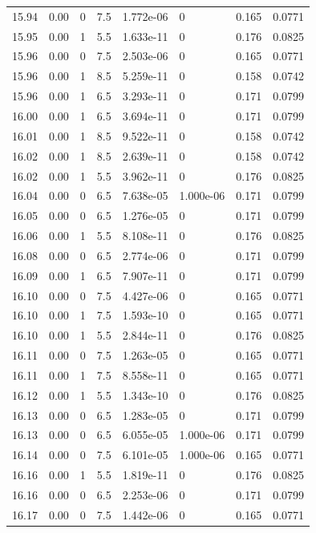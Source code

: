 \documentclass[preview]{standalone}
\begin{document}
{{{{{{{{{{{{{{{{{{{\begin{tabular}{L{1.2cm}C{1.2cm} C{0.3cm}C{0.5cm} C{1.4cm}C{1.4cm} C{1.4cm}C{1.4cm}}
  15.94  &  0.00  & 0     & 7.5 &  1.772e-06  & 0  & 0.165 &  0.0771   \\ 
  15.95  &  0.00  & 1     & 5.5 &  1.633e-11  & 0  & 0.176 &  0.0825   \\ 
  15.96  &  0.00  & 0     & 7.5 &  2.503e-06  & 0  & 0.165 &  0.0771   \\ 
  15.96  &  0.00  & 1     & 8.5 &  5.259e-11  & 0  & 0.158 &  0.0742   \\ 
  15.96  &  0.00  & 1     & 6.5 &  3.293e-11  & 0  & 0.171 &  0.0799   \\ 
  16.00  &  0.00  & 1     & 6.5 &  3.694e-11  & 0  & 0.171 &  0.0799   \\ 
  16.01  &  0.00  & 1     & 8.5 &  9.522e-11  & 0  & 0.158 &  0.0742   \\ 
  16.02  &  0.00  & 1     & 8.5 &  2.639e-11  & 0  & 0.158 &  0.0742   \\ 
  16.02  &  0.00  & 1     & 5.5 &  3.962e-11  & 0  & 0.176 &  0.0825   \\ 
  16.04  &  0.00  & 0     & 6.5 &  7.638e-05  & 1.000e-06  & 0.171 &  0.0799   \\ 
  16.05  &  0.00  & 0     & 6.5 &  1.276e-05  & 0  & 0.171 &  0.0799   \\ 
  16.06  &  0.00  & 1     & 5.5 &  8.108e-11  & 0  & 0.176 &  0.0825   \\ 
  16.08  &  0.00  & 0     & 6.5 &  2.774e-06  & 0  & 0.171 &  0.0799   \\ 
  16.09  &  0.00  & 1     & 6.5 &  7.907e-11  & 0  & 0.171 &  0.0799   \\ 
  16.10  &  0.00  & 0     & 7.5 &  4.427e-06  & 0  & 0.165 &  0.0771   \\ 
  16.10  &  0.00  & 1     & 7.5 &  1.593e-10  & 0  & 0.165 &  0.0771   \\ 
  16.10  &  0.00  & 1     & 5.5 &  2.844e-11  & 0  & 0.176 &  0.0825   \\ 
  16.11  &  0.00  & 0     & 7.5 &  1.263e-05  & 0  & 0.165 &  0.0771   \\ 
  16.11  &  0.00  & 1     & 7.5 &  8.558e-11  & 0  & 0.165 &  0.0771   \\ 
  16.12  &  0.00  & 1     & 5.5 &  1.343e-10  & 0  & 0.176 &  0.0825   \\ 
  16.13  &  0.00  & 0     & 6.5 &  1.283e-05  & 0  & 0.171 &  0.0799   \\ 
  16.13  &  0.00  & 0     & 6.5 &  6.055e-05  & 1.000e-06  & 0.171 &  0.0799   \\ 
  16.14  &  0.00  & 0     & 7.5 &  6.101e-05  & 1.000e-06  & 0.165 &  0.0771   \\ 
  16.16  &  0.00  & 1     & 5.5 &  1.819e-11  & 0  & 0.176 &  0.0825   \\ 
  16.16  &  0.00  & 0     & 6.5 &  2.253e-06  & 0  & 0.171 &  0.0799   \\ 
  16.17  &  0.00  & 0     & 7.5 &  1.442e-06  & 0  & 0.165 &  0.0771   \\ 
\hline 
\end{tabular} 

}}}}}}}}}}}}}}}}}}}
\end{document}

